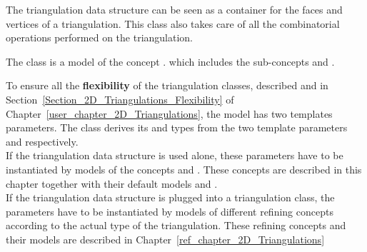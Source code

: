 

\label{ref_chapter_2D_Triangulation_Data_Structure}

The triangulation data structure can be seen as a container
for the faces and vertices of a triangulation. This class also takes care
of all the combinatorial operations performed on  the triangulation.

The class 
is  a model of the concept .
which includes the sub-concepts
and .

To ensure all the \textbf{flexibility} of  the triangulation
classes, 
described 
and in Section~\ref{Section_2D_Triangulations_Flexibility}
of
Chapter~\ref{user_chapter_2D_Triangulations}, the  model 
has two templates parameters.
The class 
derives its  and  types 
from the two template parameters  and  respectively. \\
If the triangulation data structure
is used alone, these parameters 
have to be instantiated by models
of the concepts  and 
. These concepts
are described in this chapter together with their
default models 
and  . \\
If the triangulation data structure
is plugged into a triangulation class, the parameters
have to be instantiated by models of different 
refining concepts according to the actual type of the triangulation.
These refining concepts and their models
are described in Chapter~\ref{ref_chapter_2D_Triangulations}

